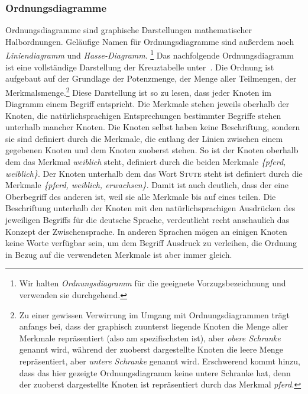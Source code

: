\documentclass[pagesize,DIV=calc,12pt,draft]{scrreprt}
\begin{document}
\subsubsection{Ordnungsdiagramme}

Ordnungsdiagramme sind graphische Darstellungen mathematischer Halbordnungen. 
Geläufige Namen für Ordnungsdiagramme sind außerdem noch \textit{Liniendiagramm} und \textit{Hasse-Diagramm}.
\footnote{Wir halten \textit{Ordnungsdiagramm} für die geeignete Vorzugsbezeichnung und verwenden sie durchgehend.}
Das nachfolgende Ordnungsdiagramm ist eine vollständige Darstellung der Kreuztabelle unter\emph{~}.
Die Ordnung ist aufgebaut auf der Grundlage der Potenzmenge, der Menge aller Teilmengen, der Merkmalsmenge.\footnote{Zu einer gewissen Verwirrung im Umgang mit Ordnungsdiagrammen trägt anfangs bei, dass der graphisch zuunterst liegende Knoten die Menge aller Merkmale repräsentiert (also am spezifischsten ist), aber \textit{obere Schranke} genannt wird, während der zuoberst dargestellte Knoten die leere Menge repräsentiert, aber \textit{untere Schranke} genannt wird. 
Erschwerend kommt hinzu, dass das hier gezeigte Ordnungsdiagramm keine untere Schranke hat, denn der zuoberst dargestellte Knoten ist repräsentiert durch das Merkmal \textit{pferd}.}
Diese Darstellung ist so zu lesen, dass jeder Knoten im Diagramm einem Begriff entspricht.
Die Merkmale stehen jeweils oberhalb der Knoten, die natürlichsprachigen Entsprechungen bestimmter Begriffe stehen unterhalb mancher Knoten.
Die Knoten selbst haben keine Beschriftung, sondern sie sind definiert durch die Merkmale, die entlang der Linien zwischen einem gegebenen Knoten und dem Knoten zuoberst stehen.
So ist der Knoten oberhalb dem das Merkmal \textit{weiblich} steht, definiert durch die beiden Merkmale \textit{\{pferd, weiblich\}}.
Der Knoten unterhalb dem das Wort \textsc{Stute} steht ist definiert durch die Merkmale \textit{\{pferd, weiblich, erwachsen\}}.
Damit ist auch deutlich, dass der eine Oberbegriff des anderen ist, weil sie alle Merkmale bis auf eines teilen.
Die Beschriftung unterhalb der Knoten mit den natürlichsprachigen Ausdrücken des jeweiligen Begriffs für die deutsche Sprache, verdeutlicht recht anschaulich das Konzept der Zwischensprache.
In anderen Sprachen mögen an einigen Knoten keine Worte verfügbar sein, um dem Begriff Ausdruck zu verleihen, die Ordnung in Bezug auf die verwendeten Merkmale ist aber immer gleich.
\end{document}
